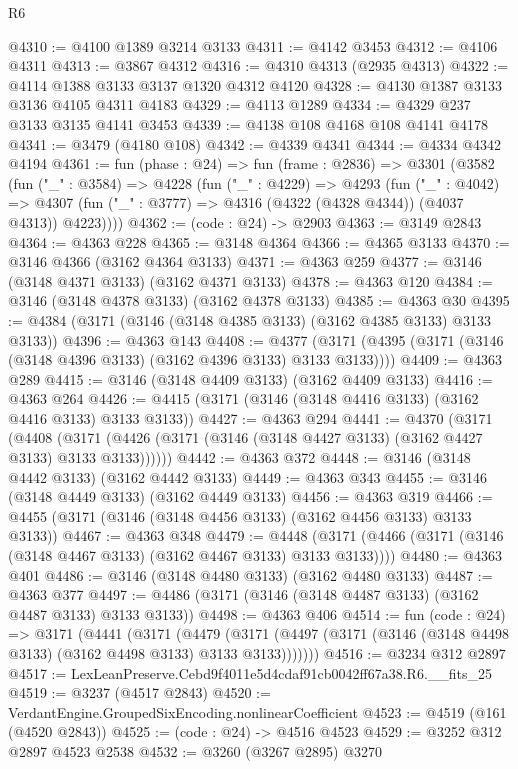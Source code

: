 \begin{lexlean}{R6}
\begin{coremodule}
@4310 := @4100 @1389 @3214 @3133
@4311 := @4142 @3453
@4312 := @4106 @4311
@4313 := @3867 @4312
@4316 := @4310 @4313 (@2935 @4313)
@4322 := @4114 @1388 @3133 @3137 @1320 @4312 @4120
@4328 := @4130 @1387 @3133 @3136 @4105 @4311 @4183
@4329 := @4113 @1289
@4334 := @4329 @237 @3133 @3135 @4141 @3453
@4339 := @4138 @108 @4168 @108 @4141 @4178
@4341 := @3479 (@4180 @108)
@4342 := @4339 @4341
@4344 := @4334 @4342 @4194
@4361 := fun (phase : @24) =>
  fun (frame : @2836) =>
  @3301
    (@3582
      (fun ("_" : @3584) =>
      @4228
        (fun ("_" : @4229) =>
        @4293
          (fun ("_" : @4042) =>
          @4307 (fun ("_" : @3777) => @4316 (@4322 (@4328 @4344)) (@4037 @4313)) @4223))))
@4362 := (code : @24) -> @2903
@4363 := @3149 @2843
@4364 := @4363 @228
@4365 := @3148 @4364
@4366 := @4365 @3133
@4370 := @3146 @4366 (@3162 @4364 @3133)
@4371 := @4363 @259
@4377 := @3146 (@3148 @4371 @3133) (@3162 @4371 @3133)
@4378 := @4363 @120
@4384 := @3146 (@3148 @4378 @3133) (@3162 @4378 @3133)
@4385 := @4363 @30
@4395 := @4384 (@3171 (@3146 (@3148 @4385 @3133) (@3162 @4385 @3133) @3133 @3133))
@4396 := @4363 @143
@4408 := @4377 (@3171 (@4395 (@3171 (@3146 (@3148 @4396 @3133) (@3162 @4396 @3133) @3133 @3133))))
@4409 := @4363 @289
@4415 := @3146 (@3148 @4409 @3133) (@3162 @4409 @3133)
@4416 := @4363 @264
@4426 := @4415 (@3171 (@3146 (@3148 @4416 @3133) (@3162 @4416 @3133) @3133 @3133))
@4427 := @4363 @294
@4441 := @4370
    (@3171
      (@4408 (@3171 (@4426 (@3171 (@3146 (@3148 @4427 @3133) (@3162 @4427 @3133) @3133 @3133))))))
@4442 := @4363 @372
@4448 := @3146 (@3148 @4442 @3133) (@3162 @4442 @3133)
@4449 := @4363 @343
@4455 := @3146 (@3148 @4449 @3133) (@3162 @4449 @3133)
@4456 := @4363 @319
@4466 := @4455 (@3171 (@3146 (@3148 @4456 @3133) (@3162 @4456 @3133) @3133 @3133))
@4467 := @4363 @348
@4479 := @4448 (@3171 (@4466 (@3171 (@3146 (@3148 @4467 @3133) (@3162 @4467 @3133) @3133 @3133))))
@4480 := @4363 @401
@4486 := @3146 (@3148 @4480 @3133) (@3162 @4480 @3133)
@4487 := @4363 @377
@4497 := @4486 (@3171 (@3146 (@3148 @4487 @3133) (@3162 @4487 @3133) @3133 @3133))
@4498 := @4363 @406
@4514 := fun (code : @24) =>
  @3171
    (@4441
      (@3171
        (@4479
          (@3171 (@4497 (@3171 (@3146 (@3148 @4498 @3133) (@3162 @4498 @3133) @3133 @3133)))))))
@4516 := @3234 @312 @2897
@4517 := LexLeanPreserve.Cebd9f4011e5d4cdaf91cb0042ff67a38.R6.__fits_25
@4519 := @3237 (@4517 @2843)
@4520 := VerdantEngine.GroupedSixEncoding.nonlinearCoefficient
@4523 := @4519 (@161 (@4520 @2843))
@4525 := (code : @24) -> @4516 @4523
@4529 := @3252 @312 @2897 @4523 @2538
@4532 := @3260 (@3267 @2895) @3270

\end{coremodule}
\end{lexlean}
